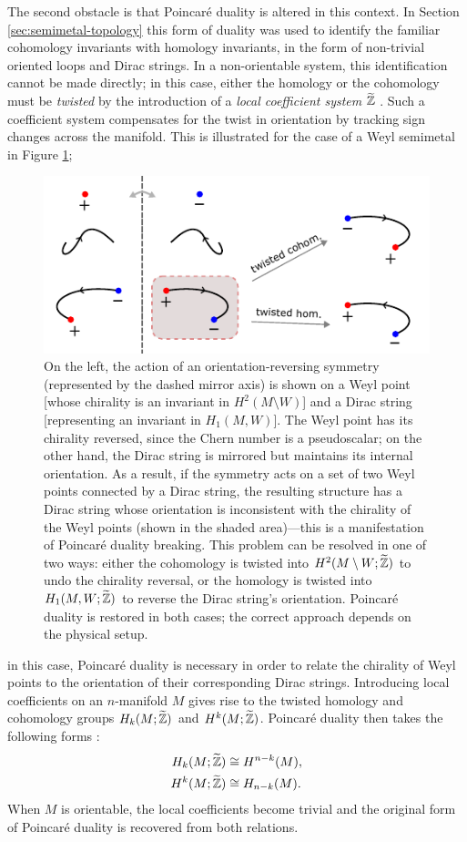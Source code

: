 The second obstacle is that Poincaré duality is altered in this context. In Section \ref{sec:semimetal-topology} this form of duality was used to identify the familiar cohomology invariants with homology invariants, in the form of non-trivial oriented loops and Dirac strings. In a non-orientable system, this identification cannot be made directly; in this case, either the homology or the cohomology must be \emph{twisted} by the introduction of a \emph{local coefficient system} $\widetilde{\mathbb{Z}}$ \cites{Whitehead_Homotopy}{Hatcher_algebraic-topology}. Such a coefficient system compensates for the twist in orientation by tracking sign changes across the manifold. This is illustrated for the case of a Weyl semimetal in Figure \ref{fig:local_coefficients};
\begin{figure}[htb!]
	\centering
	\includegraphics[width=.9\linewidth]{Images/local_coefficients}
	\caption{On the left, the action of an orientation-reversing symmetry (represented by the dashed mirror axis) is shown on a Weyl point [whose chirality is an invariant in $H^2(M\setminus W)$] and a Dirac string  [representing an invariant in $H_1(M,W)$]. The Weyl point has its chirality reversed, since the Chern number is a pseudoscalar; on the other hand, the Dirac string is mirrored but maintains its internal orientation. As a result, if the symmetry acts on a set of two Weyl points connected by a Dirac string, the resulting structure has a Dirac string whose orientation is inconsistent with the chirality of the Weyl points (shown in the shaded area)---this is a manifestation of Poincaré duality breaking. This problem can be resolved in one of two ways: either the cohomology is twisted into $H^2(M\setminus W;\widetilde{\mathbb{Z}})$ to undo the chirality reversal, or the homology is twisted into $H_1(M,W;\widetilde{\mathbb{Z}})$ to reverse the Dirac string's orientation. Poincaré duality is restored in both cases; the correct approach depends on the physical setup.}
	\label{fig:local_coefficients}
\end{figure}
in this case, Poincaré duality is necessary in order to relate the chirality of Weyl points to the orientation of their corresponding Dirac strings. Introducing local coefficients on an $n$-manifold $M$ gives rise to the twisted homology and cohomology groups $H_k(M;\widetilde{\mathbb{Z}})$ and $H^k(M;\widetilde{\mathbb{Z}})$. Poincaré duality then takes the following forms \parencite[Thm. 3H.6]{Hatcher_algebraic-topology}:
\begin{align*}
	H_k(M;\widetilde{\mathbb{Z}}) &\cong H^{n-k}(M), \\
	H^k(M;\widetilde{\mathbb{Z}}) &\cong H_{n-k}(M).
\end{align*}
When $M$ is orientable, the local coefficients become trivial and the original form of Poincaré duality is recovered from both relations.

